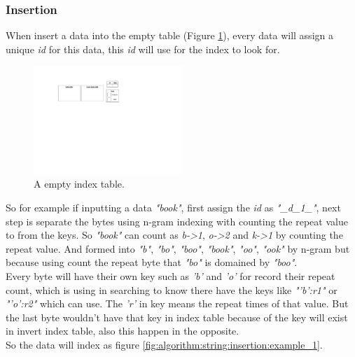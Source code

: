 \subsubsection{Insertion}

When insert a data into the empty table (Figure \ref{fig:algorithm:string:insertion:empty_table}), every data will assign a unique \textit{id} for this data, this \textit{id} will use for the index to look for.

\begin{figure}[h]
\centering
\includegraphics[width=0.5\textwidth]{./algorithm/string/pic/insertion/empty_table_v2.pdf}
\caption{A empty index table.}
\label{fig:algorithm:string:insertion:empty_table}
\end{figure}

So for example if inputting a data \textit{"book"}, first assign the \textit{id} as \textit{"\_d\_1\_"}, next step is separate the bytes using n-gram indexing with counting the repeat value to from the keys. So \textit{"book"} can count as \textit{b-\textgreater1}, \textit{o-\textgreater2} and \textit{k-\textgreater1} by counting the repeat value. And formed into \textit{"b"}, \textit{"bo"}, \textit{"boo"}, \textit{"book"}, \textit{"oo"}, \textit{"ook"} by n-gram but because using count the repeat byte that \textit{"bo"} is domained by \textit{"boo"}.\\

Every byte will have their own key such as \textit{'b'} and \textit{'o'} for record their repeat count, which is using in searching to know there have the keys like \textit{"'b':r1"} or \textit{"'o':r2"} which can use. The \textit{'r'} in key means the repeat times of that value. But the last byte wouldn't have that key in index table because of the key will exist in invert index table, also this happen in the opposite.\\

So the data will index as figure \ref{fig:algorithm:string:insertion:example_1}.

